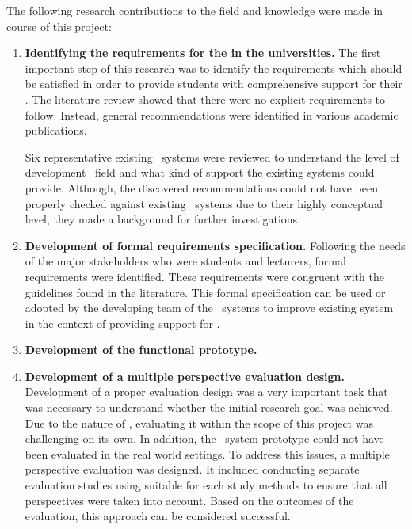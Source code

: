 The following research contributions to the field and knowledge were made in
course of this project:
\begin{enumerate}
  \item \textbf{Identifying the requirements for the \LLLs in the universities.}
  The first important step of this research was to identify the requirements
  which should be satisfied in order to provide students with comprehensive
  support for their \LLLsn. The literature review showed that there were no
  explicit requirements to follow. Instead, general recommendations were
  identified in various academic publications. 
  
  Six representative existing \ep~systems were reviewed to understand the
  level of development \ep~field and what kind of \LLLs support the existing
  systems could provide. Although, the discovered recommendations could not
  have been properly checked against existing \ep~systems due to their highly
  conceptual level, they made a background for further investigations.
  
  \item \textbf{Development of formal requirements specification.} Following the
  needs of the major stakeholders who were students and lecturers, formal
  requirements were identified. These requirements were congruent with the
  guidelines found in the literature. This formal specification can be used or
  adopted by the developing team of the \ep~systems to improve existing system
  in the context of providing support for \LLLsn.
  
  \item \textbf{Development of the functional prototype.}
  
  \item \textbf{Development of a multiple perspective evaluation design.}
  Development of a proper evaluation design was a very important task that was
  necessary to understand whether the initial research goal was achieved.  
  Due to the nature of \LLLsn, evaluating it within the scope of this project
  was challenging on its own. In addition, the \ep~system prototype could not
  have been evaluated in the real world settings. To address this issues, a
  multiple perspective evaluation was designed. It included conducting separate
  evaluation studies using suitable for each study methods to ensure that all
  perspectives were taken into account. Based on the outcomes of the evaluation,
  this approach can be considered successful.
\end{enumerate}

